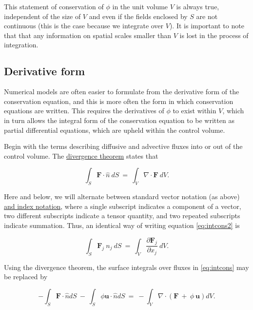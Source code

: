 This statement of conservation of $\phi$ in the unit volume $V$ is always true, independent of the 
size of $V$ and even if the fields enclosed by $S$ are not continuous (this is the case because we
integrate over $V$). It is important to note that that any information on spatial scales smaller than $V$ 
is lost in the process of integration.

\subsection{Derivative form}

Numerical models are often easier to formulate from the derivative form of the conservation equation, and this
is more often the form in which conservation equations are written. This requires the derivatives of $\phi$ to exist 
within $V$, which in turn allows the integral form of the conservation equation to be written as partial differential 
equations, which are upheld within the control volume.

Begin with the terms describing diffusive and advective fluxes into or out of the control volume. The
\href{http://en.wikipedia.org/wiki/Divergence_theorem}{divergence theorem} states that

\begin{equation}
{ \int }_{S} {\mathbf F} {\cdot} \hat{n} ~dS~ = ~{ \int }_{V} \nabla 
    {\cdot} {\mathbf F} ~dV. 
    \label{eq:intcons2}
\end{equation}

\noindent
Here and below, we will alternate between standard vector notation (as above) \href{http://en.wikipedia.org/wiki/Index_notation}{and 
index notation}, where a single subscript indicates a component of a vector, two different subscripts indicate a tensor quantity, 
and two repeated subscripts indicate summation. Thus, an identical way of writing equation \eqref{eq:intcons2} is 

\begin{equation}
{ \int }_{ S} {\mathbf F}_{ j} ~n_{ j} ~dS~ = ~{ \int }_{ V} {\frac{
    \partial {\mathbf F}_{ j} }{ \partial x_{ j} }} ~dV.
\end{equation}

Using the divergence theorem, the surface integrals over fluxes in \eqref{eq:intcons} may be replaced by

\begin{equation}
-{ \int }_{ S} {\mathbf F} {\cdot} \hat{n}dS~ - ~{ \int }_{ S} \phi {\mathbf u}
    {\cdot}\hat{n} dS~ = ~ -{ \int }_{ V} \nabla {\cdot} \left ( {
    {\mathbf F}~ + ~ \phi ~ {\mathbf u}} \right )dV.
\end{equation}

